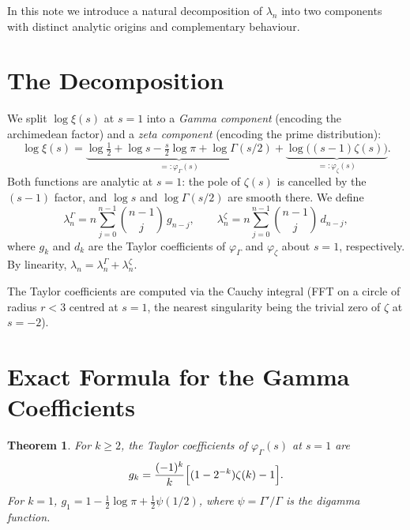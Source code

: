 \documentclass[11pt,a4paper]{article}
\newtheorem{theorem}{Theorem}
\newcommand{\Li}{\lambda}
\newcommand{\LiG}{\lambda^{\Gamma}}
\newcommand{\LiZ}{\lambda^{\zeta}}
\begin{document}
In this note we introduce a natural decomposition of $\Li_n$ into two
components with distinct analytic origins and complementary behaviour.

\section{The Decomposition}

We split $\log\xi(s)$ at $s=1$ into a \emph{Gamma component} (encoding the
archimedean factor) and a \emph{zeta component} (encoding the prime distribution):
\begin{equation}\label{eq:split}
  \log\xi(s) = \underbrace{\log\tfrac{1}{2} + \log s - \tfrac{s}{2}\log\pi
    + \log\Gamma(s/2)}_{\displaystyle =: \varphi_\Gamma(s)}
  + \underbrace{\log\bigl((s{-}1)\zeta(s)\bigr)}_{\displaystyle =: \varphi_\zeta(s)}.
\end{equation}
Both functions are analytic at $s=1$: the pole of $\zeta(s)$ is cancelled by
the $(s{-}1)$ factor, and $\log s$ and $\log\Gamma(s/2)$ are smooth there.
We define
\begin{equation}\label{eq:li-split}
  \LiG_n = n\sum_{j=0}^{n-1}\binom{n{-}1}{j}\,g_{n-j}, \qquad
  \LiZ_n = n\sum_{j=0}^{n-1}\binom{n{-}1}{j}\,d_{n-j},
\end{equation}
where $g_k$ and $d_k$ are the Taylor coefficients of $\varphi_\Gamma$ and
$\varphi_\zeta$ about $s=1$, respectively. By linearity, $\Li_n = \LiG_n + \LiZ_n$.

The Taylor coefficients are computed via the Cauchy integral (FFT on a circle
of radius $r<3$ centred at $s=1$, the nearest singularity being the trivial
zero of $\zeta$ at $s=-2$).

\section{Exact Formula for the Gamma Coefficients}

\begin{theorem}\label{thm:gk}
For $k\ge 2$, the Taylor coefficients of $\varphi_\Gamma(s)$ at $s=1$ are
\begin{equation}\label{eq:gk}
  g_k = \frac{(-1)^k}{k}\Bigl[(1-2^{-k})\zeta(k) - 1\Bigr].
\end{equation}
For $k=1$, $g_1 = 1 - \tfrac{1}{2}\log\pi + \tfrac{1}{2}\psi(1/2)$,
where $\psi = \Gamma'/\Gamma$ is the digamma function.
\end{theorem}
\end{document}
